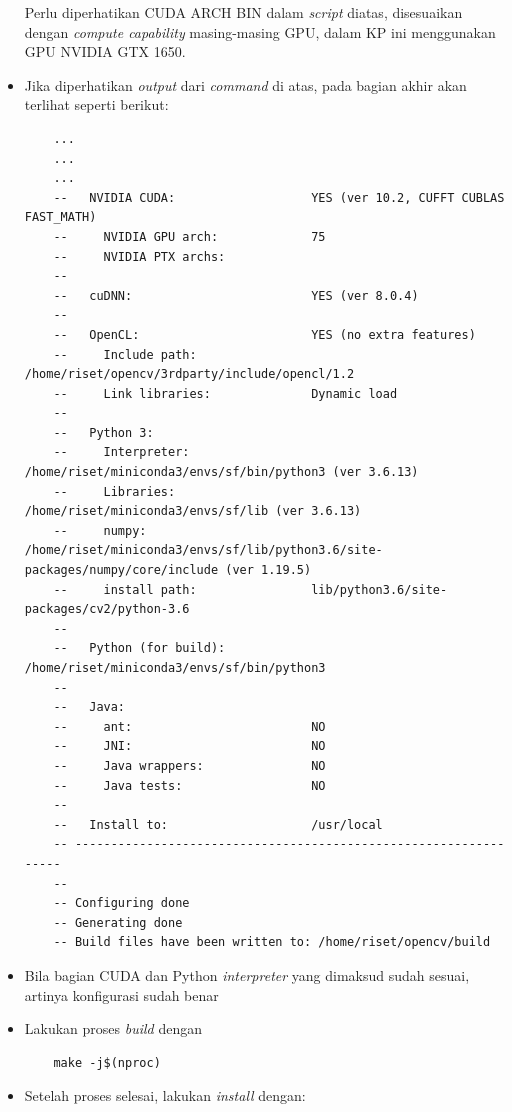 \begin{itemize}
  Perlu diperhatikan CUDA ARCH BIN dalam \textit{script} diatas, disesuaikan dengan \textit{compute capability} masing-masing GPU, dalam KP ini menggunakan GPU NVIDIA GTX 1650.

  \item Jika diperhatikan \textit{output} dari \textit{command} di atas, pada bagian akhir akan terlihat seperti berikut:
  
  \begin{lstlisting}
    ...
    ...
    ...
    --   NVIDIA CUDA:                   YES (ver 10.2, CUFFT CUBLAS FAST_MATH)
    --     NVIDIA GPU arch:             75
    --     NVIDIA PTX archs:
    -- 
    --   cuDNN:                         YES (ver 8.0.4)
    -- 
    --   OpenCL:                        YES (no extra features)
    --     Include path:                /home/riset/opencv/3rdparty/include/opencl/1.2
    --     Link libraries:              Dynamic load
    -- 
    --   Python 3:
    --     Interpreter:                 /home/riset/miniconda3/envs/sf/bin/python3 (ver 3.6.13)
    --     Libraries:                   /home/riset/miniconda3/envs/sf/lib (ver 3.6.13)
    --     numpy:                       /home/riset/miniconda3/envs/sf/lib/python3.6/site-packages/numpy/core/include (ver 1.19.5)
    --     install path:                lib/python3.6/site-packages/cv2/python-3.6
    -- 
    --   Python (for build):            /home/riset/miniconda3/envs/sf/bin/python3
    -- 
    --   Java:                          
    --     ant:                         NO
    --     JNI:                         NO
    --     Java wrappers:               NO
    --     Java tests:                  NO
    -- 
    --   Install to:                    /usr/local
    -- -----------------------------------------------------------------
    -- 
    -- Configuring done
    -- Generating done
    -- Build files have been written to: /home/riset/opencv/build
  \end{lstlisting}

  \item Bila bagian CUDA dan Python \textit{interpreter} yang dimaksud sudah sesuai, artinya konfigurasi sudah benar
  \item Lakukan proses \textit{build} dengan
  
  \begin{lstlisting}
    make -j$(nproc)
  \end{lstlisting}

  \item Setelah proses selesai, lakukan \textit{install} dengan:
  

\end{itemize}
